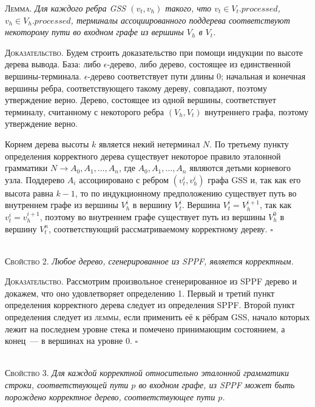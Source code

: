 \textsc{Лемма.}
\textit{Для каждого ребра GSS $(v_{t}, v_{h})$ такого, что $v_{t} \in V_{t}.processed$, $v_{h} \in V_{h}.processed$, терминалы ассоциированного поддерева соответствуют некоторому пути во входном графе из вершины $V_{h}$ в $V_{t}$.}

\textsc{Доказательство.}
Будем строить доказательство при помощи индукции по высоте дерева вывода. База: либо 
$\epsilon$-дерево, либо дерево, состоящее из единственной вершины-терминала. 
$\epsilon$-дерево соответствует пути длины $0$; начальная и конечная вершины 
ребра, соответствующего такому дереву, совпадают, поэтому утверждение верно. 
Дерево, состоящее из одной вершины, соответствует терминалу, считанному с 
некоторого ребра $(V_{h}, V_{t})$ внутреннего графа, поэтому утверждение верно.

Корнем дерева высоты $k$ является некий нетерминал $N$. По третьему пункту 
определения корректного дерева существует некоторое правило эталонной 
грамматики $N \rightarrow A_{0}, A_{1}, \dots, A_{n}$, где $A_{0}, A_{1}, 
\dots, A_{n}$ являются детьми корневого узла. Поддерево $A_{i}$ 
ассоциировано с ребром $(v_{t}^{i}, v_{h}^{i})$ графа GSS и, так как его 
высота равна $k-1$, то по индукционному предположению существует путь во 
внутреннем графе из вершины $V_{h}^{i}$ в вершину $V_{t}^{i}$. Вершина 
$V_{t}^{i} = V_{h}^{i+1}$, так как $v_{t}^{i} = v_{h}^{i+1}$, поэтому во 
внутреннем графе существует путь из вершины $V_{h}^{0}$ в вершину 
$V_{t}^{n}$, соответствующий рассматриваемому корректному дереву. $\square$~\\~

\textsc{Свойство 2.} 
\textit{Любое дерево, сгенерированное из SPPF, является корректным.}

\textsc{Доказательство.}
Рассмотрим произвольное сгенерированное из SPPF дерево и докажем, что оно 
удовлетворяет определению 1. Первый и третий пункт определения корректного дерева следует из определения SPPF. Второй пункт определения следует из \textsc{леммы}, если применить её к рёбрам GSS, начало которых лежит на последнем уровне стека и помечено принимающим состоянием, а конец~--- в вершинах на уровне 0. $\square$~\\~

\textsc{Свойство 3.} 
\textit{Для каждой корректной относительно эталонной грамматики строки, соответствующей пути $p$ во входном графе, из SPPF может быть порождено корректное дерево, соответствующее пути $p$.}

